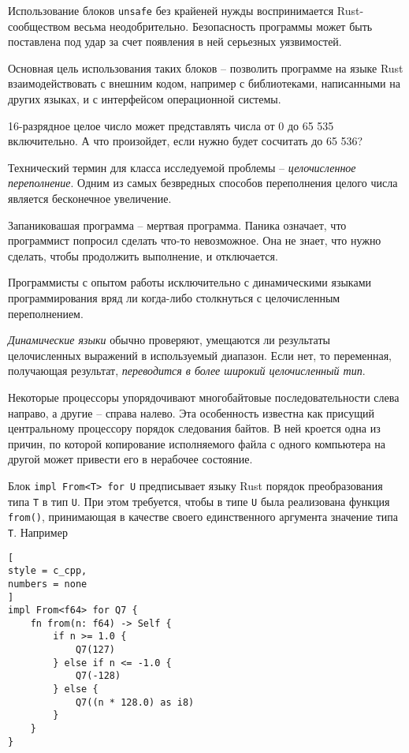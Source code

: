 \documentclass[%
	11pt,
	a4paper,
	utf8,
		]{article}
\begin{document}
Использование блоков \texttt{unsafe} без крайеней нужды воспринимается Rust-сообществом весьма неодобрительно. Безопасность программы может быть поставлена под удар за счет появления в ней серьезных уязвимостей.

{
\color{blue}
Основная цель использования таких блоков -- позволить программе на языке Rust взаимодействовать с внешним кодом, например с библиотеками, написанными на других языках, и с интерфейсом операционной системы.
}

16-разрядное целое число может представлять числа от 0 до 65 535 включительно. А что произойдет, если нужно будет сосчитать до 65 536?

Технический термин для класса исследуемой проблемы -- \emph{целочисленное переполнение}. Одним из самых безвредных способов переполнения целого числа является бесконечное увеличение.

Запаниковашая программа -- мертвая программа. Паника означает, что программист попросил сделать что-то невозможное. Она не знает, что нужно сделать, чтобы продолжить выполнение, и отключается.

Программисты с опытом работы исключительно с динамическими языками программирования вряд ли когда-либо столкнуться с целочисленным переполнением.

\emph{Динамические языки} обычно проверяют, умещаются ли результаты целочисленных выражений в используемый диапазон. Если нет, то переменная, получающая результат, \emph{переводится в более широкий целочисленный тип}.

Некоторые процессоры упорядочивают многобайтовые последовательности слева направо, а другие -- справа налево. Эта особенность известна как присущий центральному процессору порядок следования байтов. В ней кроется одна из причин, по которой копирование исполняемого файла с одного компьютера на другой может привести его в нерабочее состояние.

Блок \verb|impl From<T> for U| предписывает языку Rust порядок преобразования типа \verb|T| в тип \verb|U|. При этом требуется, чтобы в типе \verb|U| была реализована функция \verb|from()|, принимающая в качестве своего единственного аргумента значение типа \verb|T|. Например
\begin{lstlisting}[
style = c_cpp,
numbers = none
]
impl From<f64> for Q7 {
    fn from(n: f64) -> Self {
        if n >= 1.0 {
            Q7(127)
        } else if n <= -1.0 {
            Q7(-128)
        } else {
            Q7((n * 128.0) as i8)
        }
    }
}
\end{lstlisting}
\end{document}
